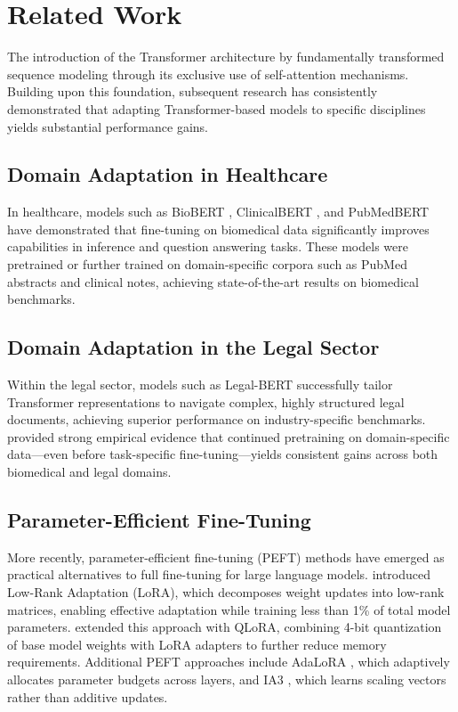 \documentclass[12pt, letterpaper]{article}
\begin{document}
\section{Related Work}
\label{sec:related-work}

The introduction of the Transformer architecture by \citet{vaswani2017attention} fundamentally transformed sequence modeling through its exclusive use of self-attention mechanisms. Building upon this foundation, subsequent research has consistently demonstrated that adapting Transformer-based models to specific disciplines yields substantial performance gains.

\subsection{Domain Adaptation in Healthcare}

In healthcare, models such as BioBERT \citep{lee2020biobert}, ClinicalBERT \citep{alsentzer2019clinicalbert}, and PubMedBERT \citep{gu2021domainspecific} have demonstrated that fine-tuning on biomedical data significantly improves capabilities in inference and question answering tasks. These models were pretrained or further trained on domain-specific corpora such as PubMed abstracts and clinical notes, achieving state-of-the-art results on biomedical benchmarks.

\subsection{Domain Adaptation in the Legal Sector}

Within the legal sector, models such as Legal-BERT \citep{chalkidis2020legalbert} successfully tailor Transformer representations to navigate complex, highly structured legal documents, achieving superior performance on industry-specific benchmarks. \citet{gururangan2020dont} provided strong empirical evidence that continued pretraining on domain-specific data---even before task-specific fine-tuning---yields consistent gains across both biomedical and legal domains.

\subsection{Parameter-Efficient Fine-Tuning}

More recently, parameter-efficient fine-tuning (PEFT) methods have emerged as practical alternatives to full fine-tuning for large language models. \citet{hu2022lora} introduced Low-Rank Adaptation (LoRA), which decomposes weight updates into low-rank matrices, enabling effective adaptation while training less than 1\% of total model parameters. \citet{dettmers2023qlora} extended this approach with QLoRA, combining 4-bit quantization of base model weights with LoRA adapters to further reduce memory requirements. Additional PEFT approaches include AdaLoRA \citep{zhang2023adalora}, which adaptively allocates parameter budgets across layers, and IA3 \citep{liu2022ia3}, which learns scaling vectors rather than additive updates.
\end{document}

